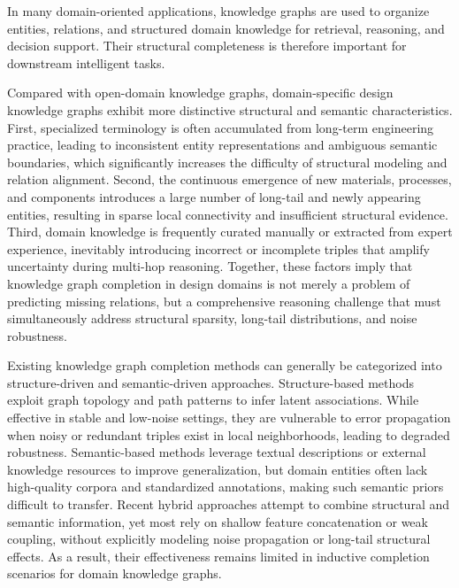 \documentclass[preprint,12pt]{elsarticle}
\begin{document}
In many domain-oriented applications, knowledge graphs are used to organize entities, relations, and structured domain knowledge for retrieval, reasoning, and decision support. Their structural completeness is therefore important for downstream intelligent tasks.

Compared with open-domain knowledge graphs, domain-specific design knowledge graphs exhibit more distinctive structural and semantic characteristics. First, specialized terminology is often accumulated from long-term engineering practice, leading to inconsistent entity representations and ambiguous semantic boundaries, which significantly increases the difficulty of structural modeling and relation alignment. Second, the continuous emergence of new materials, processes, and components introduces a large number of long-tail and newly appearing entities, resulting in sparse local connectivity and insufficient structural evidence. Third, domain knowledge is frequently curated manually or extracted from expert experience, inevitably introducing incorrect or incomplete triples that amplify uncertainty during multi-hop reasoning. Together, these factors imply that knowledge graph completion in design domains is not merely a problem of predicting missing relations, but a comprehensive reasoning challenge that must simultaneously address structural sparsity, long-tail distributions, and noise robustness.

Existing knowledge graph completion methods can generally be categorized into structure-driven and semantic-driven approaches. Structure-based methods exploit graph topology and path patterns to infer latent associations. While effective in stable and low-noise settings, they are vulnerable to error propagation when noisy or redundant triples exist in local neighborhoods, leading to degraded robustness. Semantic-based methods leverage textual descriptions or external knowledge resources to improve generalization, but domain entities often lack high-quality corpora and standardized annotations, making such semantic priors difficult to transfer. Recent hybrid approaches attempt to combine structural and semantic information, yet most rely on shallow feature concatenation or weak coupling, without explicitly modeling noise propagation or long-tail structural effects. As a result, their effectiveness remains limited in inductive completion scenarios for domain knowledge graphs.
\end{document}
